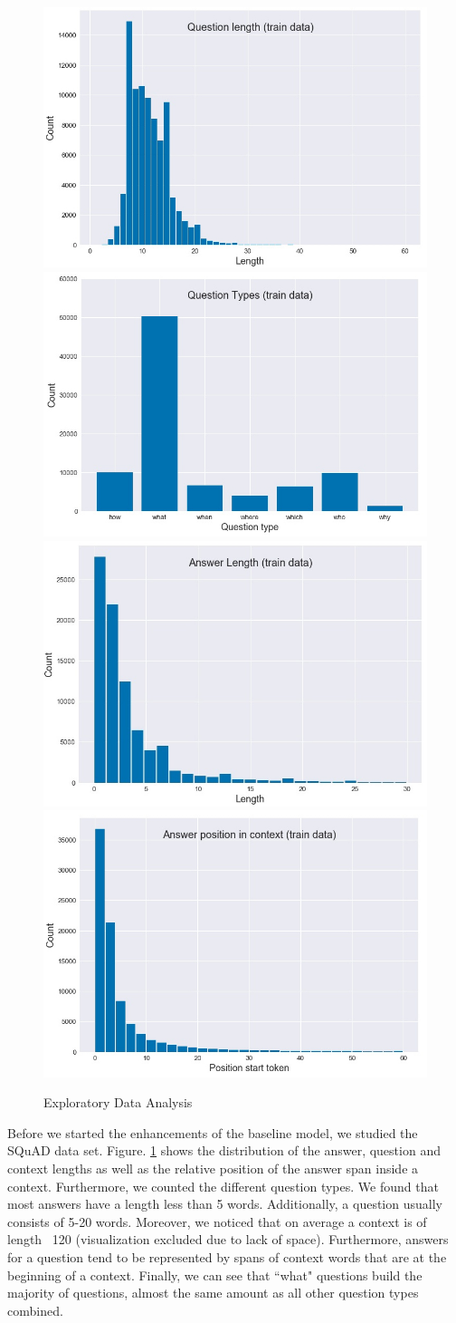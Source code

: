 \documentclass{article} %
\begin{document}
\begin{figure}[htp]
	\centering
	\includegraphics[width=.5\textwidth]{figures/q1.jpg}\hfill
	\includegraphics[width=.5\textwidth]{figures/q2.jpg}\hfill
	\includegraphics[width=.5\textwidth]{figures/a1.jpg}\hfill
	\includegraphics[width=.5\textwidth]{figures/a2.jpg}\hfill
	\caption{Exploratory Data Analysis}
	\label{dataset}
\end{figure}
Before we started the enhancements of the baseline model, we studied the SQuAD data set. Figure. \ref{dataset} shows the distribution of the answer, question and context lengths as well as the relative position of the answer span inside a context. Furthermore, we counted the different question types. We found that most answers have a length less than 5 words. Additionally, a question usually consists of 5-20 words. Moreover, we noticed that on average a context is of length ~120 (visualization excluded due to lack of space). Furthermore, answers for a question tend to be represented by spans of context words that are at the beginning of a context. Finally, we can see that ``what" questions build the majority of questions, almost the same amount as all other question types combined.
\end{document}
